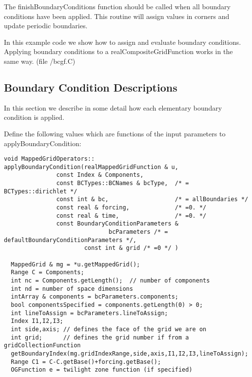 The {\ff finishBoundaryConditions} function should be called when
all boundary conditions have been applied. This routine will
assign values in corners and update periodic boundaries.




In this example code we show how to assign and evaluate boundary 
conditions. Applying boundary conditions to a {\ff realCompositeGridFunction}
works in the same way.
(file {\ff \examples /bcgf.C})
{\footnotesize
{}
}




\subsection{Boundary Condition Descriptions}

In this section we describe in some detail how each elementary boundary 
condition is applied.


Define the following values which are functions of the input parameters
to {\ff applyBoundaryCondition}:
\begin{verbatim}
void MappedGridOperators::
applyBoundaryCondition(realMappedGridFunction & u, 
		       const Index & Components,
		       const BCTypes::BCNames & bcType,  /* = BCTypes::dirichlet */
		       const int & bc,                   /* = allBoundaries */
		       const real & forcing,             /* =0. */
		       const real & time,                /* =0. */
		       const BoundaryConditionParameters & 
                              bcParameters /* = defaultBoundaryConditionParameters */,
                       const int & grid /* =0 */ )

  MappedGrid & mg = *u.getMappedGrid();
  Range C = Components;
  int nc = Components.getLength();  // number of components
  int nd = number of space dimensions
  intArray & components = bcParameters.components;
  bool componentsSpecified = components.getLength(0) > 0;
  int lineToAssign = bcParameters.lineToAssign;    
  Index I1,I2,I3;
  int side,axis; // defines the face of the grid we are on
  int grid;      // defines the grid number if from a gridCollectionFunction
  getBoundaryIndex(mg.gridIndexRange,side,axis,I1,I2,I3,lineToAssign);
  Range C1 = C-C.getBase()+forcing.getBase();
  OGFunction e = twilight zone function (if specified)
\end{verbatim}

